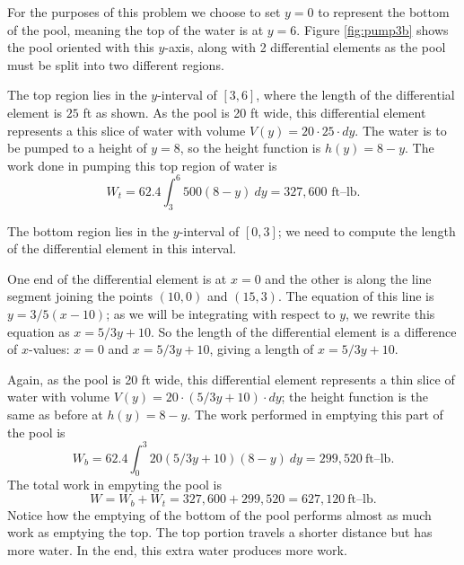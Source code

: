 {For the purposes of this problem we choose to set $y=0$ to represent the bottom of the pool, meaning the top of the water is at $y=6$. 
Figure \ref{fig:pump3b} shows the pool oriented with this $y$-axis, along with 2 differential elements as the pool must be split into two different regions. 

The top region lies in the $y$-interval of $[3,6]$, where the length of the differential element is $25$ ft as shown. As the pool is 20 ft wide, this differential element represents a this slice of water with volume $V(y) = 20\cdot25\cdot dy$.  The water is to be pumped to a height of $y=8$, so the height function is $h(y) = 8-y$. The work done in pumping this top region of water is 
$$W_t = 62.4\int_3^6 500(8-y)\ dy = 327,600 \text{ ft--lb}.$$

The bottom region lies in the $y$-interval of $[0,3]$; we need to compute the length of the differential element in this interval.

One end of the differential element is at $x=0$ and the other is along the line segment joining the points $(10,0)$ and $(15,3)$. The equation of this line is $y= 3/5(x-10)$; as we will be integrating with respect to $y$, we rewrite this equation as $x=5/3y+10$. So the length of the differential element is a difference of $x$-values: $x=0$ and $x=5/3y+10$, giving a length of $x=5/3y+10$. 

Again, as the pool is 20 ft wide, this differential element  represents a thin slice of water with volume $V(y) = 20\cdot(5/3y+10)\cdot dy$; the height function is the same as before at $h(y)=8-y$. The work performed in emptying this part of the pool is
$$W_b = 62.4\int_0^3 20(5/3y+10)(8-y)\ dy = 299,520\ \text{ft--lb}.$$
The total work in empyting the pool is 
$$W = W_b+W_t = 327,600+299,520 = 627,120\ \text{ft--lb}.$$		
Notice how the emptying of the bottom of the pool performs almost as much work as emptying the top. The top portion travels a shorter distance but has more water. In the end, this extra water produces more work.
}\\


